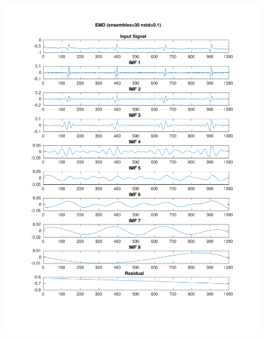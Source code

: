 \documentclass[11pt,a4paper]{article}
\begin{document}
\begin{figure}[H]
\centering
\begin{minipage}{0.48\textwidth}
	\centering
	\includegraphics[width=\textwidth]{fig/112l2_emd_ensemble.pdf}
\end{minipage}
\begin{minipage}{0.48\textwidth}
	\centering

\end{minipage}
\end{figure}
\end{document}
